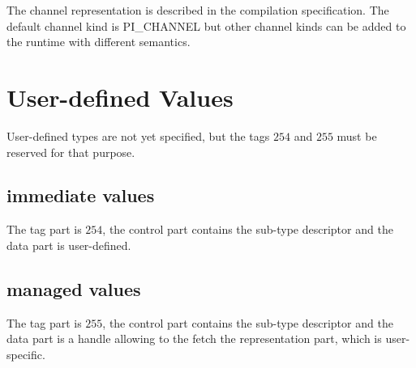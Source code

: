 \documentclass[a4paper,11pt]{article}
\newcommand{\code}[1]{\textsf{#1}}
\begin{document}
The channel representation is described in the compilation specification.
The default channel kind is \code{PI\_CHANNEL} but other channel kinds can be
added to the runtime with different semantics.

\section{User-defined Values}

User-defined types are not yet specified, but the tags $254$ and $255$ must
be reserved for that purpose.

\subsection{immediate values}

The tag part is $254$, the control part contains the sub-type descriptor
 and the data part is user-defined.

\subsection{managed values}

The tag part is $255$, the control part contains the sub-type descriptor
 and the data part is a handle allowing to the fetch the representation part,
 which is user-specific.
\end{document}
